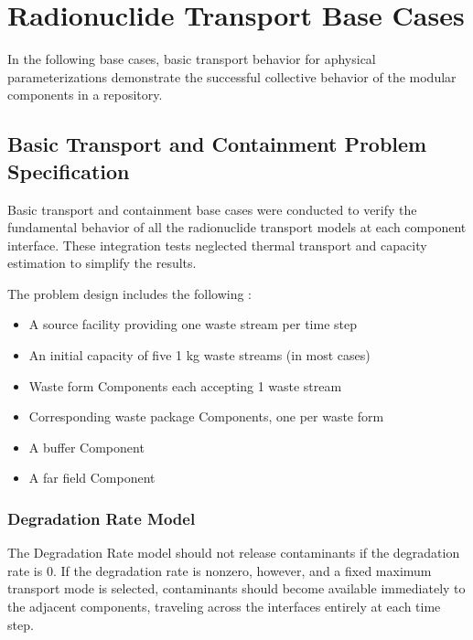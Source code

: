 \section{Radionuclide Transport Base Cases}\label{sec:nuclide_base_cases}
In the following base cases, basic transport behavior for aphysical 
parameterizations demonstrate the successful collective behavior of the modular 
components in a \Cyder repository.

\subsection{Basic Transport and Containment Problem Specification}
Basic transport and containment base cases were conducted to verify the 
fundamental behavior of all the radionuclide transport models at each component 
interface. These integration tests neglected thermal transport and capacity 
estimation to simplify the results.  

The problem design includes the following : 
\begin{itemize}
\item{A source facility providing one waste stream per time step}
\item{An initial capacity of five 1 kg waste streams (in most cases)}
\item{Waste form Components each accepting 1 waste stream} 
\item{Corresponding waste package Components, one per waste form}
\item{A buffer Component}
\item{A far field Component}
\end{itemize}

\subsubsection{Degradation Rate Model}
The Degradation Rate model should not release contaminants if the degradation 
rate is 0. If the degradation rate is nonzero, however, and a fixed maximum 
transport mode is selected, contaminants should become available immediately to 
the adjacent components, traveling across the interfaces entirely at each 
time step. 

